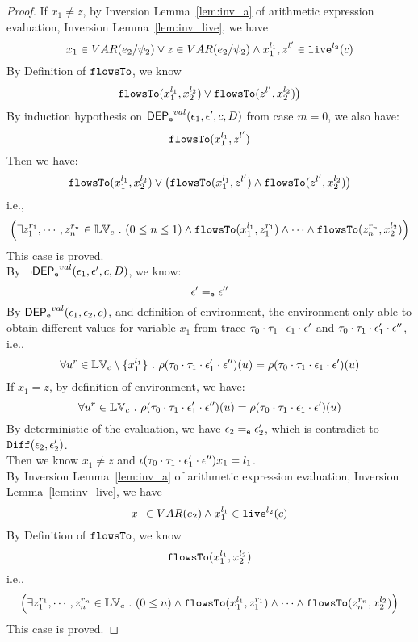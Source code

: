{\begin{proof}
If $x_1 \neq z$, by {Inversion Lemma~\ref{lem:inv_a}} of arithmetic expression evaluation, Inversion Lemma~\ref{lem:inv_live}, we have 
%
\[
  x_1 \in VAR(e_2 / \psi_2) \lor z \in VAR(e_2 / \psi_2) 
  \land x_1^{l_1}, z^{l'} \in \mathtt{live}^{l_2}(c)
\]
%
By Definition of $\mathtt{flowsTo}$, we know
\[
  \mathtt{flowsTo}(x_1^{l_1}, x_2^{l_2}) \lor \mathtt{flowsTo}(z^{l'}, x_2^{l_2}) \big)
\]
%
By induction hypothesis on $\mathsf{DEP_{\mathtt{e}}}^{val}(\mathtt{\epsilon}_1, \mathtt{\epsilon}', c, D)$ from case $m = 0$, we also have:
\[
  \mathtt{flowsTo}(x_1^{l_1}, z^{l'})
\]
%
Then we have:
%
\[
  \mathtt{flowsTo}(x_1^{l_1}, x_2^{l_2}) \lor  \big( \mathtt{flowsTo}(x_1^{l_1}, z^{l'}) \land \mathtt{flowsTo}(z^{l'}, x_2^{l_2}) \big)
\]
%
i.e.,
%
\[
\Big(\exists z_1^{r_1}, \cdots, z_n^{r_n} \in \mathbb{LV}_{{c}} ~.~ (0 \leq n \leq 1 )
 \land \mathtt{flowsTo}(x_1^{l_1}, z_1^{r_1}) \land \cdots \land \mathtt{flowsTo}(z_n^{r_n}, {x}_2^{l_2}) \Big)
\]
%
This case is proved.
%
\\
By $\neg \mathsf{DEP_{\mathtt{e}}}^{val}(\mathtt{\epsilon}_1, \mathtt{\epsilon}', c, D)$, we know:
\[
  \mathtt{\epsilon}' =_{\mathtt{e}} \mathtt{\epsilon}''
\]
%
By $\mathsf{DEP_{\mathtt{e}}}^{val}(\mathtt{\epsilon}_1, \mathtt{\epsilon}_2, c)$, and definition of environment, 
the environment only able to obtain different values for variable $x_1$
from trace $\mathtt{\tau}_0 \cdot \mathtt{\tau}_1 \cdot \mathtt{\epsilon}_1 \cdot \mathtt{\epsilon}'$ and 
$\mathtt{\tau}_0 \cdot \mathtt{\tau}_1 \cdot \mathtt{\epsilon}_1' \cdot \mathtt{\epsilon}''$, i.e.,
\[
  \forall u^r \in \mathbb{LV}_c \setminus \{x_1^{l_1}\} ~.~
  \rho(\mathtt{\tau}_0 \cdot \mathtt{\tau}_1 \cdot \mathtt{\epsilon}_1' \cdot \mathtt{\epsilon}'') (u) =  
  \rho(\mathtt{\tau}_0 \cdot \mathtt{\tau}_1 \cdot \mathtt{\epsilon}_1 \cdot \mathtt{\epsilon}') (u)
\]
%
If $x_1 = z$, by definition of environment, we have:
\[
    \forall u^r \in \mathbb{LV}_c ~.~
  \rho(\mathtt{\tau}_0 \cdot \mathtt{\tau}_1 \cdot \mathtt{\epsilon}_1' \cdot \mathtt{\epsilon}'') (u) =  
  \rho(\mathtt{\tau}_0 \cdot \mathtt{\tau}_1 \cdot \mathtt{\epsilon}_1 \cdot \mathtt{\epsilon}') (u)
\]
By deterministic of the evaluation, we have $\mathtt{\epsilon}_2 =_{\mathtt{e}} \mathtt{\epsilon}_2'$, which is contradict to $\mathtt{Diff}(\mathtt{\epsilon}_2, \mathtt{\epsilon}_2')$.
%
\\
Then we know $x_1 \neq z$ and $\iota(\mathtt{\tau}_0 \cdot \mathtt{\tau}_1 \cdot \mathtt{\epsilon}_1' \cdot \mathtt{\epsilon}'') x_1 = l_1$.
\\
%
By {Inversion Lemma~\ref{lem:inv_a}} of arithmetic expression evaluation, Inversion Lemma~\ref{lem:inv_live}, we have 
\[
  x_1 \in VAR(e_2) \land x_1^{l_1} \in \mathtt{live}^{l_2}(c)
\]
%
By Definition of $\mathtt{flowsTo}$, we know
\[
  \mathtt{flowsTo}(x_1^{l_1}, x_2^{l_2}) 
\]
%
i.e.,
%
\[
\Big(\exists z_1^{r_1}, \cdots, z_n^{r_n} \in \mathbb{LV}_{{c}} ~.~ (0 \leq n  )
 \land \mathtt{flowsTo}(x_1^{l_1}, z_1^{r_1}) \land \cdots \land \mathtt{flowsTo}(z_n^{r_n}, {x}_2^{l_2}) \Big)
\]
This case is proved.
%
%

\end{proof}}
